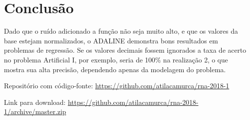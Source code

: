 \section{Conclusão}\label{conclusuxe3o}

Dado que o ruído adicionado a função não seja muito alto, e que os
valores da base estejam normalizados, o ADALINE demonstra bons
resultados em problemas de regressão. Se os valores decimais fossem
ignorados a taxa de acerto no problema Artificial I, por exemplo, seria
de 100\% na realização 2, o que mostra sua alta precisão, dependendo
apenas da modelagem do problema.

Repositório com código-fonte:
\url{https://github.com/atilacamurca/rna-2018-1}

Link para download:
\url{https://github.com/atilacamurca/rna-2018-1/archive/master.zip}
